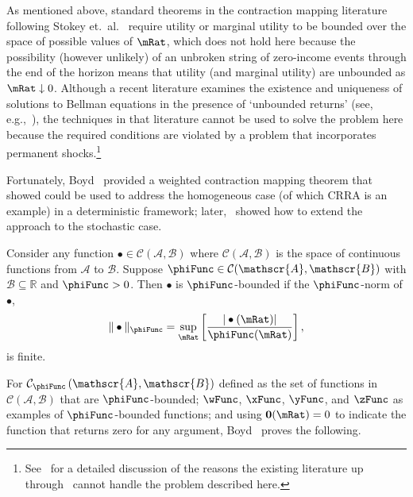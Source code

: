 \documentclass[BufferStockTheory]{subfiles}
\begin{document}
As mentioned above, standard theorems in the contraction mapping literature following Stokey et.\ al.~\citeyearpar{slpMethods} require utility or marginal utility to be bounded over the space of possible values of $\mRat$, which does not hold here because the possibility (however unlikely) of an unbroken string of zero-income events through the end of the horizon means that utility (and marginal utility) are unbounded as $\mRat \downarrow 0$.  Although a recent literature examines the existence and uniqueness of solutions to Bellman equations in the presence of `unbounded returns' (see, e.g.,~\cite{mnUnique}), the techniques in that literature cannot be used to solve the problem here because the required conditions are violated by a problem that incorporates permanent shocks.\footnote{See~\cite{yaoNote} for a detailed discussion of the reasons the existing literature up through~\cite{mnUnique} cannot handle the problem described here.}

Fortunately, Boyd~\citeyearpar{jboydWeighted} provided a weighted contraction mapping theorem that~\cite{asHomogeneous} showed could be used to address the homogeneous case (of which CRRA is an example) in a deterministic framework; later,~\cite{duranDiscounting} showed how to extend the~\cite{jboydWeighted} approach to the stochastic case.
\begin{defn}
  Consider any function $\bullet\in \mathcal{C}(\mathscr{A},\mathscr{B})$ where $\mathcal{C}(\mathscr{A},\mathscr{B})$ is the space of continuous functions from $\mathscr{A}$ to $%
  \mathscr{B}$. Suppose $\phiFunc \in \mathcal{C}(\mathscr{A},\mathscr{B})$ with $%
  \mathscr{B}\subseteq\mathbb{R}$ and $\phiFunc >0$. Then $\bullet$ is $\phiFunc$-bounded if the $\phiFunc$-norm of $\bullet$,
  \begin{equation}
    \Vert \bullet\Vert _{\phiFunc }=\sup_{\mRat}\left[ \frac{|\bullet(\mRat)|}{\phiFunc (\mRat)}\right] ,
    \label{eq:phinorm}
  \end{equation}%
  is finite.
\end{defn}

For $\mathcal{C}_{\phiFunc }\left( \mathscr{A},\mathscr{B}\right) $ defined as the set of functions in $\mathcal{C}(\mathscr{A},\mathscr{B})$ that are $\phiFunc$-bounded; $\wFunc$, $\xFunc$, $\yFunc$, and $\zFunc$ as examples of $\phiFunc$-bounded functions; and using {$\mathbf{0}(\mRat)=0$} to indicate the function that returns zero for any argument, Boyd~\citeyearpar{jboydWeighted} proves the following.
\end{document}
